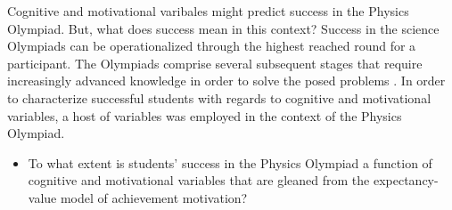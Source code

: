 \documentclass[D:/studies/WinnerS/Erhebungen/IPhO1718/paper/problem_solving/main/TaylorFrancis/interactapasample]{subfiles}
\begin{document}
Cognitive and motivational varibales might predict success in the Physics Olympiad. But, what does success mean in this context? Success in the science Olympiads can be operationalized through the highest reached round for a participant. The Olympiads comprise several subsequent stages that require increasingly advanced knowledge in order to solve the posed problems \citep{Koehler.2017}. In order to characterize successful students with regards to cognitive and motivational variables, a host of variables was employed in the context of the Physics Olympiad. 

\begin{itemize}
\item To what extent is students' success in the Physics Olympiad a function of cognitive and motivational variables that are gleaned from the expectancy-value model of achievement motivation?
\end{itemize}
\end{document}
